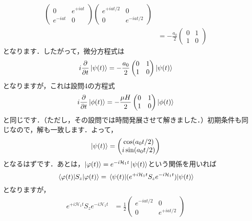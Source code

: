 \documentclass[a4paper,pdflatex,ja=standard]{bxjsarticle}
\begin{document}
\begin{enumerate}
\begin{align}
\begin{pmatrix}
      0 & e^{+iat} \\
      e^{-iat} & 0
    \end{pmatrix}
    \begin{pmatrix}
      e^{+iat/2} & 0 \\
      0 & e^{-iat/2}
    \end{pmatrix}
    \nonumber
    \\
    &=
    -\frac{a_0}{2}
    \begin{pmatrix}
      0 & 1 \\
      1 & 0
    \end{pmatrix}
  \end{align}
  となります．したがって，微分方程式は
  \begin{equation}
    i\pdv{}{t}
    \ket{\psi(t)}
    =
    -\frac{a_0}{2}
    \begin{pmatrix}
      0 & 1 \\
      1 & 0
    \end{pmatrix}
    \ket{\psi(t)}
  \end{equation}
  となりますが，これは設問4の方程式
  \begin{equation}    
    i\pdv{}{t}
    \ket{\phi(t)}
    =
    -\frac{\mu H}{2}
    \begin{pmatrix}
      0 & 1 \\
      1 & 0
    \end{pmatrix}
    \ket{\phi(t)}
  \end{equation}
  と同じです．（ただし，その設問では時間発展させて解きました．）初期条件も同じなので，解も一致します．よって，
  \begin{equation}
    \ket{\psi(t)}
    =
    \begin{pmatrix}
      \cos (a_0 t/2) \\
      i\sin (a_0 t/2)
    \end{pmatrix}    
  \end{equation}
  となるはずです．あとは，$\ket{\varphi(t)}=e^{-i\mathcal{H}_1t}\ket{\psi(t)}$という関係を用いれば
  \begin{equation}
    \mel*{\varphi(t)}{S_z}{\varphi(t)}
    =
    \mel*{\psi(t)}{(e^{+i\mathcal{H}_1t}S_ze^{-i\mathcal{H}_1t})}{\psi(t)}    
  \end{equation}
  となりますが，
  \begin{align}
    e^{+i\mathcal{H}_1t}S_ze^{-i\mathcal{H}_1t}
    &=
    \frac{1}{2}
    \begin{pmatrix}
      e^{-iat/2} & 0 \\
      0 & e^{+iat/2}
    \end{pmatrix}

\end{align}
\end{enumerate}
\end{document}
